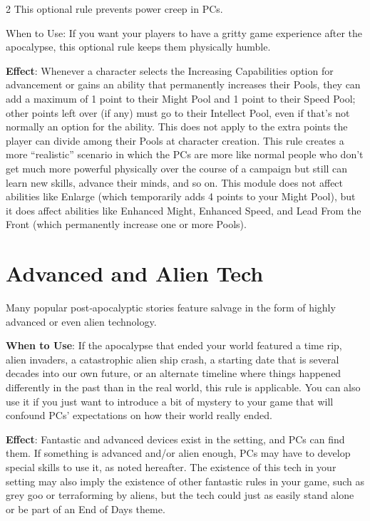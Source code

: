 \begin{multicols}{2}
This optional rule prevents power creep in PCs. 

When to Use: If you want your players to have a gritty game experience after the apocalypse, this optional rule keeps them physically humble.

\textbf{Effect}: Whenever a character selects the Increasing Capabilities option for advancement or gains an ability that permanently increases their Pools, they can
add a maximum of 1 point to their Might Pool and 1 point to their Speed Pool; other points left over (if any) must go to their Intellect Pool, even if that’s not normally an option for the ability. This does not apply to the extra points the player can divide among their Pools at character creation. This rule creates a more “realistic” scenario in which the PCs are more like normal people who don’t get much more powerful physically over the course of a campaign but still can learn new skills, advance their minds, and so on. This module does not affect abilities like Enlarge (which temporarily adds 4 points to your Might Pool), but it does affect abilities like Enhanced Might, Enhanced Speed, and Lead From the Front (which permanently increase one or more Pools).

\section{Advanced and Alien Tech}

Many popular post‑apocalyptic stories feature salvage in the form of highly advanced or even alien technology.

\textbf{When to Use}: If the apocalypse that ended your world featured a time rip, alien invaders, a catastrophic alien ship crash, a starting date that is several decades into our own future, or an alternate timeline where things happened differently in the past than in the real world, this rule is applicable. You can also use it if you just want to introduce a bit of mystery to your game that will confound PCs’ expectations on how their world really ended.

\textbf{Effect}: Fantastic and advanced devices exist in the setting, and PCs can find them. If something is advanced and/or alien enough, PCs may have to develop special skills to use it, as noted hereafter. The existence of this tech in your setting may also imply the existence of other fantastic rules in your game, such as grey goo or terraforming by aliens, but the tech could just as easily stand alone or be part of an End of Days theme.


\end{multicols}
